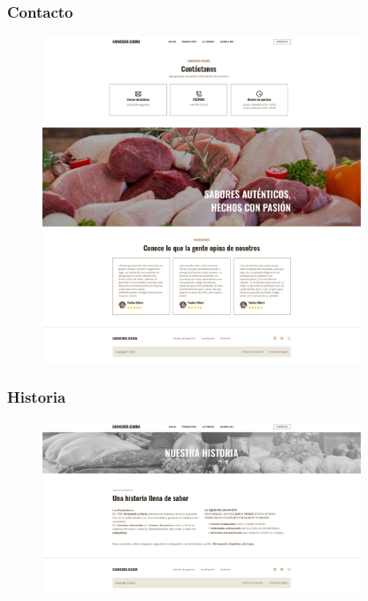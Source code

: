 \documentclass[a4paper]{article}
\begin{document}
\subsubsection{Contacto}
\begin{figure}[H]
    \centering
    \includegraphics[width=0.85\textwidth]{images/contact.png}
\end{figure}

\subsubsection{Historia}
\begin{figure}[H]
    \centering
    \includegraphics[width=0.85\textwidth]{images/history.png}
\end{figure}
\end{document}
